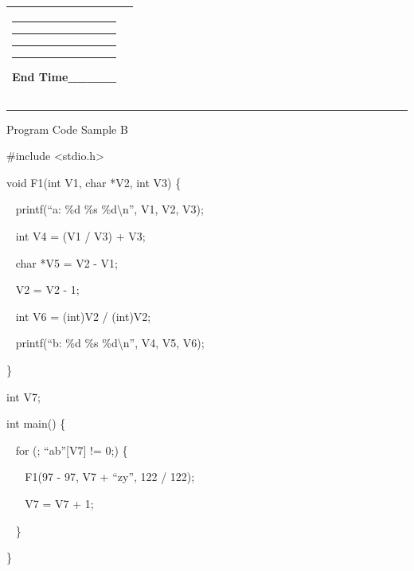 \documentclass[12pt, a4paper, oneside]{article}
\begin{document}
\begin{longtable}[]{@{}ll@{}}
\begin{minipage}[t]{0.47\columnwidth}
{}

\begin{center}\rule{0.5\linewidth}{\linethickness}\end{center}

{}

\begin{center}\rule{0.5\linewidth}{\linethickness}\end{center}

{}

\begin{center}\rule{0.5\linewidth}{\linethickness}\end{center}

{}

\begin{center}\rule{0.5\linewidth}{\linethickness}\end{center}

{}

{}

{End Time\_\_\_\_\_}
\strut\end{minipage}\tabularnewline
\bottomrule
\end{longtable}

\begin{center}\rule{0.5\linewidth}{\linethickness}\end{center}

{Program Code Sample B}

{}

{\#include \textless{}stdio.h\textgreater{}}

{void F1(int V1, char *V2, int V3) \{}

{~ printf(``a: \%d \%s \%d\textbackslash{}n'', V1, V2, V3);}

{~ int V4 = (V1 / V3) + V3;}

{~ char *V5 = V2 - V1;}

{~ V2 = V2 - 1;}

{~ int V6 = (int)V2 / (int)V2;}

{~ printf(``b: \%d \%s \%d\textbackslash{}n'', V4, V5, V6);}

{\}}

{int V7;}

{int main() \{}

{~ for (; ``ab''{[}V7{]} != 0;) \{}

{~ ~ F1(97 - 97, V7 + ``zy'', 122 / 122);}

{~ ~ V7 = V7 + 1;}

{~ \}}

{\}}
\end{document}
